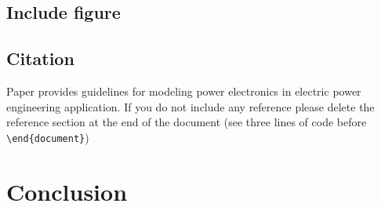 \documentclass[]{zjureport}
\begin{document}
\subsection{Include figure}
\blindtext[1]

\subsection{Citation}
Paper \cite{Gole97} provides guidelines for modeling power electronics in electric power engineering application. If you do not include any reference please delete the reference section at the end of the document (see three lines of code before \texttt{\textbackslash end\{document\}})


\section{Conclusion}

\newpage


\end{document}
